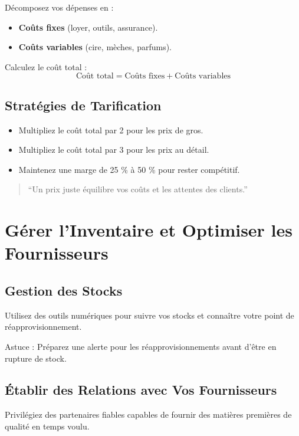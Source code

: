 \documentclass[11pt,fleqn,onecolumn,oneside]{book}
\begin{document}
Décomposez vos dépenses en :
\begin{itemize}
    \item \textbf{Coûts fixes} (loyer, outils, assurance).
    \item \textbf{Coûts variables} (cire, mèches, parfums).
\end{itemize}

Calculez le coût total : 
\[
\text{Coût total} = \text{Coûts fixes} + \text{Coûts variables}
\]

\subsection*{Stratégies de Tarification}

\begin{itemize}
    \item Multipliez le coût total par 2 pour les prix de gros.
    \item Multipliez le coût total par 3 pour les prix au détail.
    \item Maintenez une marge de 25 \% à 50 \% pour rester compétitif.
\end{itemize}

\begin{quote}
``Un prix juste équilibre vos coûts et les attentes des clients.''
\end{quote}

\section{Gérer l’Inventaire et Optimiser les Fournisseurs}

\subsection*{Gestion des Stocks}

Utilisez des outils numériques pour suivre vos stocks et connaître votre point de réapprovisionnement.

\begin{remark}
Astuce : Préparez une alerte pour les réapprovisionnements avant d’être en rupture de stock.
\end{remark}

\subsection*{Établir des Relations avec Vos Fournisseurs}

Privilégiez des partenaires fiables capables de fournir des matières premières de qualité en temps voulu.
\end{document}
